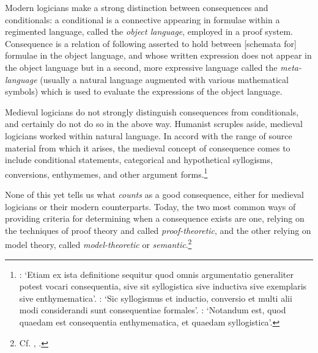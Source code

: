 \documentclass[]{article}
\begin{document}
Modern logicians make a strong distinction between consequences and conditionals: a conditional is a connective appearing in formulae within a regimented language, called the \textit{object language}, employed in a proof system. Consequence is a relation of following asserted to hold between [schemata for] formulae in the object language, and whose written expression does not appear in the object language but in a second, more expressive language called the \textit{meta-language} (usually a natural language augmented with various mathematical symbols) which is used to evaluate the expressions of the object language. 

Medieval logicians do not strongly distinguish consequences from conditionals, and certainly do not do so in the above way. Humanist scruples aside, medieval logicians worked within natural language. In accord with the range of source material from which it arises, the medieval concept of consequence comes to include conditional statements, categorical and hypothetical syllogisms, conversions, enthymemes, and other argument forms.\footnote{\autocite[A.I, par. 3, p. 92]{Green-Pedersen1982}: `Etiam ex ista definitione sequitur quod omnis argumentatio generaliter potest vocari consequentia, sive sit syllogistica sive inductiva sive exemplaris sive enthymematica'. \autocite[V. c. 1, p. 31.4-5]{OckhamTML}: `Sic syllogismus et inductio, conversio et multi alii modi considerandi sunt consequentiae formales'. \autocite[I. q. 20, p. 130]{Pseudo-Scotus1891}: `Notandum est, quod quaedam est consequentia enthymematica, et quaedam syllogistica'.}

None of this yet tells us what \textit{counts} as a good consequence, either for medieval logicians or their modern counterparts. Today, the two most common ways of providing criteria for determining when a consequence exists are one, relying on the techniques of proof theory and called \textit{proof-theoretic}, and the other relying on model theory, called \textit{model-theoretic} or \textit{semantic}.\footnote{Cf. \autocite{Tarski2002}, \autocite{Prawitz1974}.} 
\end{document}
